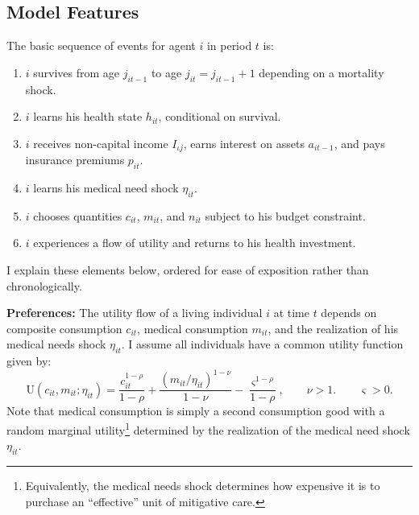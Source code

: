 \documentclass[12pt,pdftex,letterpaper]{article}
\newcommand{\Health}{h}
\newcommand{\Utility}{\text{U}}
\newcommand{\Inc}{I}
\newcommand{\Con}{c}
\newcommand{\Care}{m}
\newcommand{\Invst}{n}
\newcommand{\Assets}{a}
\newcommand{\Premium}{p}
\newcommand{\LifeUtility}{\varsigma}
\newcommand{\CRRAcon}{\rho}
\newcommand{\CRRAcare}{\nu}
\newcommand{\MedShk}{\eta}
\begin{document}
\subsection{Model Features}
\label{sec:ModelSpec}

The basic sequence of events for agent $i$ in period $t$ is:
\begin{enumerate}
\item $i$ survives from age $j_{it-1}$ to age $j_{it} = j_{it-1} + 1$ depending on a mortality shock.

\item $i$ learns his health state $\Health_{it}$, conditional on survival.

\item $i$ receives non-capital income $\Inc_{\iota j}$, earns interest on assets $\Assets_{it-1}$, and pays insurance premiums $\Premium_{it}$.

\item $i$ learns his medical need shock $\MedShk_{it}$.

\item $i$ chooses quantities $\Con_{it}$, $\Care_{it}$, and $\Invst_{it}$ subject to his budget constraint.

\item $i$ experiences a flow of utility and returns to his health investment.
\end{enumerate}
I explain these elements below, ordered for ease of exposition rather than chronologically.

\vspace{0.5cm}

\noindent \textbf{Preferences:} The utility flow of a living individual $i$ at time $t$ depends on composite consumption $\Con_{it}$, medical consumption $\Care_{it}$, and the realization of his medical needs shock $\MedShk_{it}$.  I assume all individuals have a common utility function given by:
\begin{equation}\label{Utility}
\Utility(\Con_{it},\Care_{it};\MedShk_{it}) = \frac{\Con_{it}^{1 - \CRRAcon}}{1 - \CRRAcon} + \frac{(\Care_{it}/\MedShk_{it})^{1 - \CRRAcare}}{1 - \CRRAcare} - \frac{\LifeUtility^{1 - \CRRAcon}}{1 - \CRRAcon}, \qquad \CRRAcare > 1. \qquad \LifeUtility > 0.
\end{equation}
Note that medical consumption is simply a second consumption good with a random marginal utility\footnote{Equivalently, the medical needs shock determines how expensive it is to purchase an ``effective'' unit of mitigative care.} determined by the realization of the medical need shock $\MedShk_{it}$. 
\end{document}

